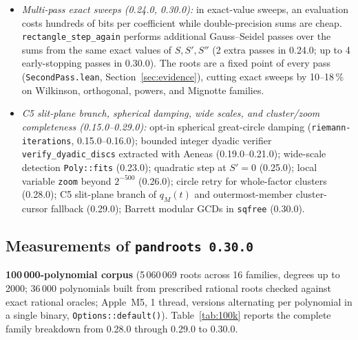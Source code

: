 \documentclass[10pt,a4paper]{article}
\theoremstyle{definition}
\numberwithin{equation}{section}
\begin{document}
\begin{itemize}
\item \emph{Multi-pass exact sweeps (0.24.0, 0.30.0):} in exact-value sweeps, an evaluation costs hundreds of bits per coefficient while double-precision sums are cheap. \texttt{rectangle\_step\_again} performs additional Gauss--Seidel passes over the sums from the same exact values of $S,S',S''$ (2 extra passes in 0.24.0; up to 4 early-stopping passes in 0.30.0). The roots are a fixed point of every pass (\texttt{SecondPass.lean}, Section~\ref{sec:evidence}), cutting exact sweeps by 10--18\,\% on Wilkinson, orthogonal, powers, and Mignotte families.
\item \emph{C5 slit-plane branch, spherical damping, wide scales, and cluster/zoom completeness (0.15.0--0.29.0):} opt-in spherical great-circle damping (\texttt{riemann-iterations}, 0.15.0--0.16.0); bounded integer dyadic verifier \texttt{verify\_dyadic\_discs} extracted with Aeneas (0.19.0--0.21.0); wide-scale detection \texttt{Poly::fits} (0.23.0); quadratic step at $S'=0$ (0.25.0); local variable \texttt{zoom} beyond $2^{-500}$ (0.26.0); circle retry for whole-factor clusters (0.28.0); C5 slit-plane branch of $q_M(t)$ and outermost-member cluster-cursor fallback (0.29.0); Barrett modular GCDs in \texttt{sqfree} (0.30.0).
\end{itemize}

\subsection{Measurements of \texttt{pandroots 0.30.0}}

\textbf{100\,000-polynomial corpus} (5\,060\,069 roots across 16 families, degrees up to 2000; 36\,000 polynomials built from prescribed rational roots checked against exact rational oracles; Apple~M5, 1 thread, versions alternating per polynomial in a single binary, \texttt{Options::default()}). Table~\ref{tab:100k} reports the complete family breakdown from 0.28.0 through 0.29.0 to 0.30.0.
\end{document}
